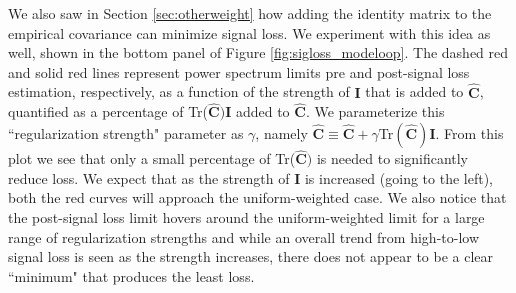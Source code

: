 \documentclass[preprint2,numberedappendix,tighten]{aastex6}  %
\begin{document}
We also saw in Section \ref{sec:otherweight} how adding the identity matrix to the empirical covariance can minimize signal loss. We experiment with this idea as well, shown in the bottom panel of Figure \ref{fig:sigloss_modeloop}. The dashed red and solid red lines represent power spectrum limits pre and post-signal loss estimation, respectively, as a function of the strength of $\textbf{I}$ that is added to $\widehat{\textbf{C}}$, quantified as a percentage of Tr($\widehat{\textbf{C}})\textbf{I}$ added to $\widehat{\textbf{C}}$. We parameterize this ``regularization strength" parameter as $\gamma$, namely $\widehat{\textbf{C}} \equiv \widehat{\textbf{C}} + \gamma$Tr$(\widehat{\textbf{C}})\textbf{I}$. From this plot we see that only a small percentage of Tr($\widehat{\textbf{C}})$ is needed to significantly reduce loss. We expect that as the strength of $\textbf{I}$ is increased (going to the left), both the red curves will approach the uniform-weighted case. We also notice that the post-signal loss limit hovers around the uniform-weighted limit for a large range of regularization strengths and while an overall trend from high-to-low signal loss is seen as the strength increases, there does not appear to be a clear ``minimum" that produces the least loss.
\end{document}
